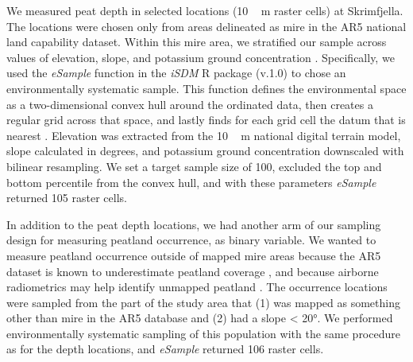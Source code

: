\documentclass[soil, manuscript]{copernicus}
\begin{document}
We measured peat depth in selected locations (\unit{10\,m} raster cells) at Skrimfjella.
The locations were chosen only from areas delineated as mire in the AR5 national land capability dataset.
Within this mire area, we stratified our sample across values of elevation, slope, and potassium ground concentration \citep[from processed airborne gamma ray spectrometry,][]{baranwalHelicopterborneMagneticElectromagnetic2013}.
Specifically, we used the \emph{eSample} function in the \emph{iSDM} R package (v.1.0) to chose an environmentally systematic sample.
This function defines the environmental space as a two-dimensional convex hull around the ordinated data, then creates a regular grid across that space, and lastly finds for each grid cell the datum that is nearest \citep{hattabUnifiedFrameworkModel2017}.
Elevation was extracted from the \unit{10\,m} national digital terrain model, slope calculated in degrees, and potassium ground concentration downscaled with bilinear resampling.
We set a target sample size of 100, excluded the top and bottom percentile from the convex hull, and with these parameters \emph{eSample} returned 105 raster cells.

In addition to the peat depth locations, we had another arm of our sampling design for measuring peatland occurrence, as binary variable.
We wanted to measure peatland occurrence outside of mapped mire areas because the AR5 dataset is known to underestimate peatland coverage \citep[especially in forests,][]{brynLandCoverNorway2018}, and because airborne radiometrics may help identify unmapped peatland \citep{gatisMappingUplandPeat2019, olearyDigitalSoilMapping2022}.
The occurrence locations were sampled from the part of the study area that (1) was mapped as something other than mire in the AR5 database and (2) had a slope \textless{} 20°.
We performed environmentally systematic sampling of this population with the same procedure as for the depth locations, and \emph{eSample} returned 106 raster cells.
\end{document}
